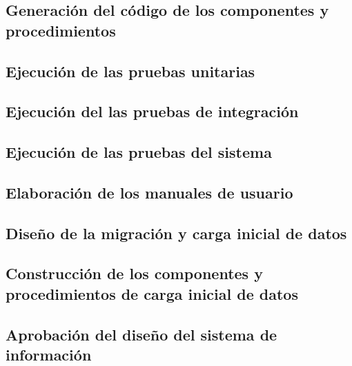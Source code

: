 \documentclass[11pt,a4paper,spanish,twoside]{report}
\begin{document}
\subsection{Generación del código de los componentes y procedimientos}
\subsection{Ejecución de las pruebas unitarias}
\subsection{Ejecución del las pruebas de integración}
\subsection{Ejecución de las pruebas del sistema}
\subsection{Elaboración de los manuales de usuario}
\subsection{Diseño de la migración y carga inicial de datos}
\subsection{Construcción de los componentes y procedimientos de carga inicial 
de datos}
\subsection{Aprobación del diseño del sistema de información}

 

\end{document}
